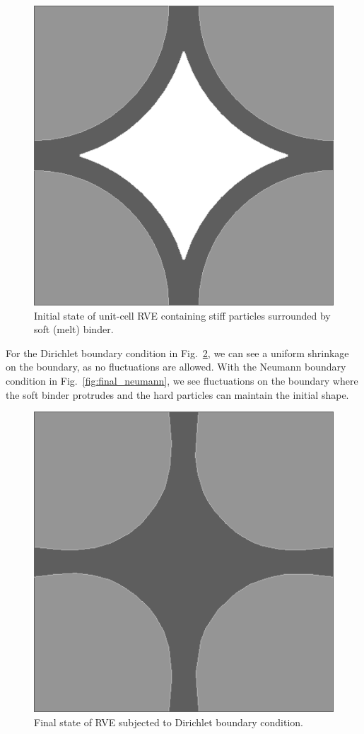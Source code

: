 \documentclass[notitlepage,a4paper,fleqn,9pt]{extarticle}
\newcommand{\figref}[1]{Fig.~\ref{#1}}
\begin{document}
\begin{multicols}{2}
\begin{figure}[H]
 \centering
 \includegraphics[scale=0.25]{figures/initial_rve}
 \caption{Initial state of unit-cell RVE containing stiff particles surrounded by soft (melt) binder.}
 \label{fig:initial_rve}
\end{figure}

For the Dirichlet boundary condition in \figref{fig:final_dirichlet}, we can see a uniform shrinkage on the boundary, as no fluctuations are allowed. 
With the Neumann boundary condition in \figref{fig:final_neumann}, we see fluctuations on the boundary where the soft binder protrudes and the hard particles can maintain the initial shape.

\begin{figure}[H]
 \centering
 \includegraphics[scale=0.25]{figures/final_dirichlet}
 \caption{Final state of RVE subjected to Dirichlet boundary condition.}
 \label{fig:final_dirichlet}
\end{figure}


\end{multicols}
\end{document}
